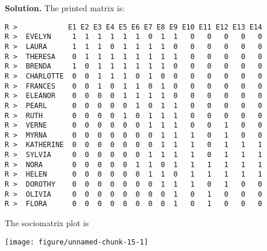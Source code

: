 \documentclass[11pt, oneside]{article}\usepackage[]{graphicx}\usepackage[]{color}
\makeatletter
\def\maxwidth{ %
  \ifdim\Gin@nat@width>\linewidth
    \linewidth
  \else
    \Gin@nat@width
  \fi
}
\newenvironment{kframe}{%
 \def\at@end@of@kframe{}%
 \ifinner\ifhmode%
  \def\at@end@of@kframe{\end{minipage}}%
  \begin{minipage}{\columnwidth}%
 \fi\fi%
 \def\FrameCommand##1{\hskip\@totalleftmargin \hskip-\fboxsep
 \colorbox{shadecolor}{##1}\hskip-\fboxsep
     \hskip-\linewidth \hskip-\@totalleftmargin \hskip\columnwidth}%
 \MakeFramed {\advance\hsize-\width
   \@totalleftmargin\z@ \linewidth\hsize
   \@setminipage}}%
 {\par\unskip\endMakeFramed%
 \at@end@of@kframe}
\newenvironment{knitrout}{}{} %
\newenvironment{solution}{\begin{trivlist} \item \textbf{Solution.}}{\end{trivlist}}
\newenvironment{prob}[2][Problem]{\begin{trivlist}
\item[\hskip \labelsep {\bfseries #1}\hskip \labelsep {\bfseries #2.}]}{\end{trivlist}}
\makeatother
\begin{document}
\begin{prob}{2}
\begin{enumerate}
\begin{solution}
The printed matrix is:
\begin{knitrout}
\color{fgcolor}\begin{kframe}
\begin{verbatim}
R >            E1 E2 E3 E4 E5 E6 E7 E8 E9 E10 E11 E12 E13 E14
R >  EVELYN     1  1  1  1  1  1  0  1  1   0   0   0   0   0
R >  LAURA      1  1  1  0  1  1  1  1  0   0   0   0   0   0
R >  THERESA    0  1  1  1  1  1  1  1  1   0   0   0   0   0
R >  BRENDA     1  0  1  1  1  1  1  1  0   0   0   0   0   0
R >  CHARLOTTE  0  0  1  1  1  0  1  0  0   0   0   0   0   0
R >  FRANCES    0  0  1  0  1  1  0  1  0   0   0   0   0   0
R >  ELEANOR    0  0  0  0  1  1  1  1  0   0   0   0   0   0
R >  PEARL      0  0  0  0  0  1  0  1  1   0   0   0   0   0
R >  RUTH       0  0  0  0  1  0  1  1  1   0   0   0   0   0
R >  VERNE      0  0  0  0  0  0  1  1  1   0   0   1   0   0
R >  MYRNA      0  0  0  0  0  0  0  1  1   1   0   1   0   0
R >  KATHERINE  0  0  0  0  0  0  0  1  1   1   0   1   1   1
R >  SYLVIA     0  0  0  0  0  0  1  1  1   1   0   1   1   1
R >  NORA       0  0  0  0  0  1  1  0  1   1   1   1   1   1
R >  HELEN      0  0  0  0  0  0  1  1  0   1   1   1   1   1
R >  DOROTHY    0  0  0  0  0  0  0  1  1   1   0   1   0   0
R >  OLIVIA     0  0  0  0  0  0  0  0  1   0   1   0   0   0
R >  FLORA      0  0  0  0  0  0  0  0  1   0   1   0   0   0
\end{verbatim}
\end{kframe}
\end{knitrout}
The sociomatrix plot is
\begin{center}
\begin{knitrout}
\color{fgcolor}

{\centering \texttt{[image: figure/unnamed-chunk-15-1]} 

}



\end{knitrout}
\end{center}


\end{solution}
\end{enumerate}
\end{prob}
\end{document}
